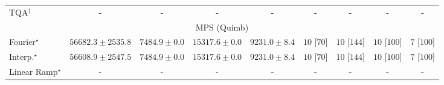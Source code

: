 \begin{tabular}{l|cccc|cccc|}
TQA$^\dagger$ & {\cellcolor[HTML]{000000}} \color[HTML]{F1F1F1} {\cellcolor{white}} \color{black} - & {\cellcolor[HTML]{000000}} \color[HTML]{F1F1F1} {\cellcolor{white}} \color{black} - & {\cellcolor[HTML]{000000}} \color[HTML]{F1F1F1} {\cellcolor{white}} \color{black} - & {\cellcolor[HTML]{000000}} \color[HTML]{F1F1F1} {\cellcolor{white}} \color{black} - & {\cellcolor[HTML]{000000}} \color[HTML]{F1F1F1} {\cellcolor{white}} \color{black} - & {\cellcolor[HTML]{000000}} \color[HTML]{F1F1F1} {\cellcolor{white}} \color{black} - & {\cellcolor[HTML]{000000}} \color[HTML]{F1F1F1} {\cellcolor{white}} \color{black} - & {\cellcolor[HTML]{000000}} \color[HTML]{F1F1F1} {\cellcolor{white}} \color{black} - \\
\cline{1-9}
\multicolumn{9}{c}{\rule{0pt}{8pt}MPS (Quimb)} \\
\midrule
Fourier$^\star$ & {\cellcolor[HTML]{662506}} \color[HTML]{F1F1F1} $56682.3\pm 2535.8$ & {\cellcolor[HTML]{FFFEE1}} \color[HTML]{000000} $7484.9\pm 0.0$ & {\cellcolor[HTML]{FFF0AD}} \color[HTML]{000000} $15317.6\pm 0.0$ & {\cellcolor[HTML]{FFFCD6}} \color[HTML]{000000} $9231.0\pm 8.4$ & {\cellcolor[HTML]{49006A}} \color[HTML]{F1F1F1} $10$ [$70$] & {\cellcolor[HTML]{49006A}} \color[HTML]{F1F1F1} $10$ [$144$] & {\cellcolor[HTML]{49006A}} \color[HTML]{F1F1F1} $10$ [$100$] & {\cellcolor[HTML]{CD238F}} \color[HTML]{F1F1F1} $7$ [$100$] \\
Interp.$^\star$ & {\cellcolor[HTML]{662506}} \color[HTML]{F1F1F1} $56608.9\pm 2547.5$ & {\cellcolor[HTML]{FFFEE1}} \color[HTML]{000000} $7484.9\pm 0.0$ & {\cellcolor[HTML]{FFF0AD}} \color[HTML]{000000} $15317.6\pm 0.0$ & {\cellcolor[HTML]{FFFCD6}} \color[HTML]{000000} $9231.0\pm 8.4$ & {\cellcolor[HTML]{49006A}} \color[HTML]{F1F1F1} $10$ [$70$] & {\cellcolor[HTML]{49006A}} \color[HTML]{F1F1F1} $10$ [$144$] & {\cellcolor[HTML]{49006A}} \color[HTML]{F1F1F1} $10$ [$100$] & {\cellcolor[HTML]{CD238F}} \color[HTML]{F1F1F1} $7$ [$100$] \\
Linear Ramp$^\star$ & {\cellcolor[HTML]{000000}} \color[HTML]{F1F1F1} {\cellcolor{white}} \color{black} - & {\cellcolor[HTML]{000000}} \color[HTML]{F1F1F1} {\cellcolor{white}} \color{black} - & {\cellcolor[HTML]{000000}} \color[HTML]{F1F1F1} {\cellcolor{white}} \color{black} - & {\cellcolor[HTML]{000000}} \color[HTML]{F1F1F1} {\cellcolor{white}} \color{black} - & {\cellcolor[HTML]{000000}} \color[HTML]{F1F1F1} {\cellcolor{white}} \color{black} - & {\cellcolor[HTML]{000000}} \color[HTML]{F1F1F1} {\cellcolor{white}} \color{black} - & {\cellcolor[HTML]{000000}} \color[HTML]{F1F1F1} {\cellcolor{white}} \color{black} - & {\cellcolor[HTML]{000000}} \color[HTML]{F1F1F1} {\cellcolor{white}} \color{black} - \\

\end{tabular}
